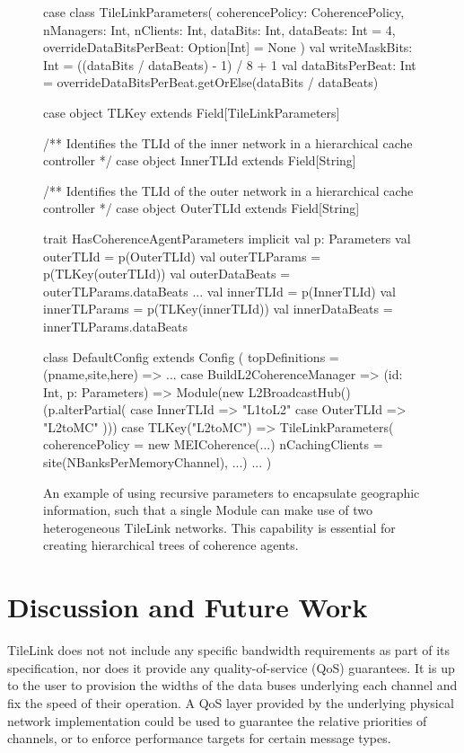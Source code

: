 \begin{figure}
\centering
\begin{scala}
case class TileLinkParameters(
    coherencePolicy: CoherencePolicy,
    nManagers: Int,
    nClients: Int,
    dataBits: Int,
    dataBeats: Int = 4,
    overrideDataBitsPerBeat: Option[Int] = None
    ) {
  val writeMaskBits: Int  = ((dataBits / dataBeats) - 1) / 8 + 1
  val dataBitsPerBeat: Int = overrideDataBitsPerBeat.getOrElse(dataBits / dataBeats)
}

case object TLKey extends Field[TileLinkParameters]

/** Identifies the TLId of the inner network in a hierarchical cache controller */
case object InnerTLId extends Field[String]

/** Identifies the TLId of the outer network in a hierarchical cache controller */
case object OuterTLId extends Field[String]

trait HasCoherenceAgentParameters {
  implicit val p: Parameters
  val outerTLId = p(OuterTLId)
  val outerTLParams = p(TLKey(outerTLId))
  val outerDataBeats = outerTLParams.dataBeats
  ...
  val innerTLId = p(InnerTLId)
  val innerTLParams = p(TLKey(innerTLId))
  val innerDataBeats = innerTLParams.dataBeats
}

class DefaultConfig extends Config (
  topDefinitions = { (pname,site,here) =>
    ...
      case BuildL2CoherenceManager => (id: Int, p: Parameters) =>
        Module(new L2BroadcastHub()(p.alterPartial({
          case InnerTLId => "L1toL2"
          case OuterTLId => "L2toMC" })))
      case TLKey("L2toMC") =>
        TileLinkParameters(
          coherencePolicy = new MEICoherence(...)
          nCachingClients = site(NBanksPerMemoryChannel), ...)
      ...
})

\end{scala} 
\caption[Using recursive parameters to encapsulate geographic TileLink parameters.]{
An example of using recursive parameters to encapsulate geographic information, such that a single Module can make use of
two heterogeneous TileLink networks.
This capability is essential for creating hierarchical trees of coherence agents.
}
\label{fig:tlgeo}
\end{figure}

\section{Discussion and Future Work}

TileLink does not not include any specific bandwidth requirements as part of its specification,
nor does it provide any quality-of-service (QoS) guarantees.
It is up to the user to provision the widths of the data buses underlying each channel and fix the speed of their operation.  
A QoS layer provided by the underlying physical network implementation could be used 
to guarantee the relative priorities of channels, or to enforce performance targets for certain message types.

